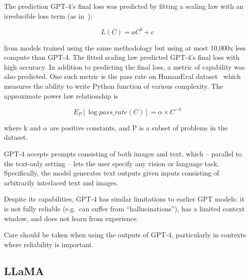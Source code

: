 The prediction GPT-4’s final loss was predicted by fitting a scaling law with an irreducible loss term (as in~\textcite{henighan2020scaling}):

\begin{equation}
	L(C) = aC^b + c
	\label{eq:gpt4-scaling-law}
\end{equation}

\noindent from models trained using the same methodology but using at most 10,000x less compute than GPT-4.
The fitted scaling law predicted GPT-4’s final loss with high accuracy.
In addition to predicting the final loss, a metric of capability was also predicted.
One such metric is the pass rate on HumanEval dataset~\cite{chen2021evaluating} which measures the ability to write Python function of various complexity.
The approximate power law relationship is

\begin{equation}
	E_P [\log{pass\_rate(C)}] = \alpha \times C^{-k}
	\label{eq:gpt4-pass-rate}
\end{equation}

\noindent where k and \(\alpha\) are positive constants, and P is a subset of problems in the dataset.

GPT-4 accepts prompts consisting of both images and text, which -- parallel to the text-only setting -- lets the user specify any vision or language task.
Specifically, the model generates text outputs given inputs consisting of arbitrarily interlaced text and images.

Despite its capabilities, GPT-4 has similar limitations to earlier GPT models: it is not fully reliable (e.g.\ can suffer from \enquote{hallucinations}), has a limited context window, and does not learn from experience.

Care should be taken when using the outputs of GPT-4, particularly in contexts where reliability is important.

\subsection{LLaMA}
\label{subsec:llama}

